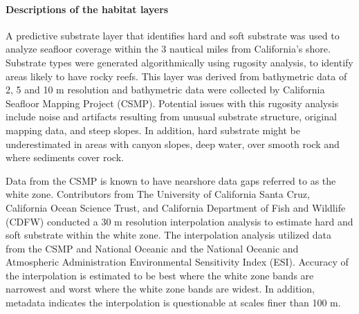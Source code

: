 \documentclass[11pt,
  english,
  a4paper,
]{article}
\begin{document}
\leavevmode\tagmcend\tagstructend


\hypertarget{descriptions-of-the-habitat-layers}{%
\paragraph{Descriptions of the habitat layers}\label{descriptions-of-the-habitat-layers}}

\leavevmode\tagmcend\tagstructend


A predictive substrate layer that identifies hard and soft substrate was used to analyze seafloor coverage within the 3 nautical miles from California's shore. Substrate types were generated algorithmically using rugosity analysis, to identify areas likely to have rocky reefs. This layer was derived from bathymetric data of 2, 5 and 10 m resolution and bathymetric data were collected by California Seafloor Mapping Project (CSMP). Potential issues with this rugosity analysis include noise and artifacts resulting from unusual substrate structure, original mapping data, and steep slopes. In addition, hard substrate might be underestimated in areas with canyon slopes, deep water, over smooth rock and where sediments cover rock.

\leavevmode\tagmcend\tagstructend\par


Data from the CSMP is known to have nearshore data gaps referred to as the white zone. Contributors from The University of California Santa Cruz, California Ocean Science Trust, and California Department of Fish and Wildlife (CDFW) conducted a 30 m resolution interpolation analysis to estimate hard and soft substrate within the white zone. The interpolation analysis utilized data from the CSMP and National Oceanic and the National Oceanic and Atmospheric Administration Environmental Sensitivity Index (ESI). Accuracy of the interpolation is estimated to be best where the white zone bands are narrowest and worst where the white zone bands are widest. In addition, metadata indicates the interpolation is questionable at scales finer than 100 m.

\leavevmode\tagmcend\tagstructend\par

\end{document}
